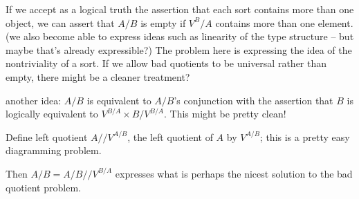 \documentclass{article}
\begin{document}
If we accept as a logical truth the assertion that each sort contains
more than one object, we can assert that $A/B$ is empty if $V^B/A$
contains more than one element.  (we also become able to express ideas
such as linearity of the type structure -- but maybe that's already
expressible?) The problem here is expressing the idea of the
nontriviality of a sort.  If we allow bad quotients to be universal
rather than empty, there might be a cleaner treatment?

another idea: $A/B$ is equivalent to $A/B$'s conjunction with the
assertion that $B$ is logically equivalent to $V^{B/A} \times B/V^{B/A}$.
This might be pretty clean!

Define left quotient $A//V^{A/B}$, the left quotient of $A$ by $V^{A/B}$;
this is a pretty easy diagramming problem.

Then $A/B = A/B//V^{B/A}$ expresses what is perhaps the nicest solution to
the bad quotient problem.
\end{document}

